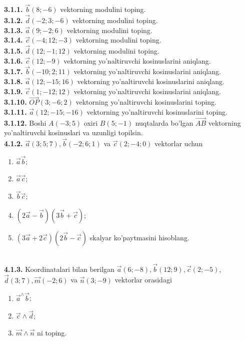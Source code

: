 \documentclass[10pt]{article}
\begin{document}
\textbf{3.1.1.} $\vec{b}(8 ;-6)$ vektorning modulini toping.\\
\textbf{3.1.2.} $\vec{d}(-2 ; 3 ;-6)$ vektorning modulini toping.\\
\textbf{3.1.3.} $\vec{a}(9 ;-2 ; 6)$ vektorning modulini toping.\\
\textbf{3.1.4.} $\vec{c}(-4 ; 12 ;-3)$ vektorning modulini toping.\\
\textbf{3.1.5.} $\vec{d}(12 ;-1 ; 12)$ vektorning modulini toping.\\
\textbf{3.1.6.} $\vec{c}(12 ;-9)$ vektorning yo'naltiruvchi kosinuslarini aniqlang.\\
\textbf{3.1.7.} $\vec{b}(-10 ; 2 ; 11)$ vektorning yo'naltiruvchi kosinuslarini aniqlang.\\
\textbf{3.1.8.} $\vec{a}(12 ;-15 ; 16)$ vektorning yo'naltiruvchi kosinuslarini aniqlang.\\
\textbf{3.1.9.} $\vec{c}(1 ;-12 ; 12)$ vektorning yo'naltiruvchi kosinuslarini aniqlang.\\
\textbf{3.1.10.} $\overrightarrow{O P}(3 ;-6 ; 2)$ vektorning yo'naltiruvchi kosinuslarini toping.\\
\textbf{3.1.11.} $\vec{a}(12 ;-15 ;-16)$ vektorning yo'naltiruvchi kosinuslarini toping.\\
\textbf{3.1.12.} Boshi $A(-3 ; 5)$ oxiri $B(5 ;-1)$ nuqtalarda bo'lgan $\overrightarrow{A B}$ vektorning yo'naltiruvchi kosinuslari va uzunligi topilsin.\\
\textbf{4.1.2.} $\vec{a}(3 ; 5 ; 7), \vec{b}(-2 ; 6 ; 1)$ va $\vec{c}(2 ;-4 ; 0)$ vektorlar uchun
\begin{enumerate}
  \item $\vec{a} \vec{b}$;
  \item $\vec{a} \vec{c}$;
  \item $\vec{b} \vec{c}$;
  \item $(2 \vec{a}-\vec{b})(3 \vec{b}+\vec{c})$;
  \item $(3 \vec{a}+2 \vec{c})(2 \vec{b}-\vec{c})$ skalyar ko'paytmasini hisoblang.
\end{enumerate}\\

\textbf{4.1.3.} Koordinatalari bilan berilgan $\vec{a}(6 ;-8), \vec{b}(12 ; 9), \vec{c}(2 ;-5)$, $\vec{d}(3 ; 7), \vec{m}(-2 ; 6)$ va $\vec{n}(3 ;-9)$ vektorlar orasidagi
\begin{enumerate}
  \item $\vec{a}^{\wedge} \vec{b}$;
  \item $\vec{c} \wedge \vec{d}$;
  \item $\vec{m} \wedge \vec{n}$ ni toping.
\end{enumerate}\\
\end{document}
